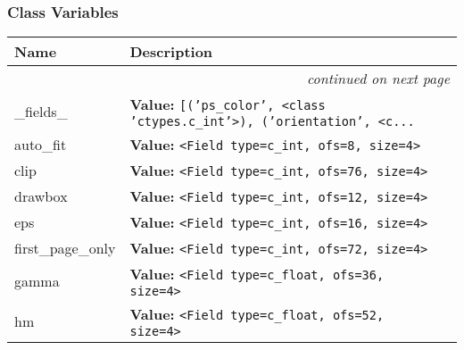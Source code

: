 
  \subsubsection{Class Variables}

    \vspace{-1cm}
\hspace{\varindent}\begin{longtable}{|p{\varnamewidth}|p{\vardescrwidth}|l}
\cline{1-2}
\cline{1-2} \centering \textbf{Name} & \centering \textbf{Description}& \\
\cline{1-2}
\endhead\cline{1-2}\multicolumn{3}{r}{\small\textit{continued on next page}}\\\endfoot\cline{1-2}
\endlastfoot\raggedright \_\-f\-i\-e\-l\-d\-s\-\_\- & \raggedright \textbf{Value:} 
{\tt \texttt{[}\texttt{(}\texttt{'}\texttt{ps\_color}\texttt{'}\texttt{, }{\textless}class 'ctypes.c\_int'{\textgreater}\texttt{)}\texttt{, }\texttt{(}\texttt{'}\texttt{orientation}\texttt{'}\texttt{, }{\textless}c\texttt{...}}&\\
\cline{1-2}
\raggedright a\-u\-t\-o\-\_\-f\-i\-t\- & \raggedright \textbf{Value:} 
{\tt {\textless}Field type=c\_int, ofs=8, size=4{\textgreater}}&\\
\cline{1-2}
\raggedright c\-l\-i\-p\- & \raggedright \textbf{Value:} 
{\tt {\textless}Field type=c\_int, ofs=76, size=4{\textgreater}}&\\
\cline{1-2}
\raggedright d\-r\-a\-w\-b\-o\-x\- & \raggedright \textbf{Value:} 
{\tt {\textless}Field type=c\_int, ofs=12, size=4{\textgreater}}&\\
\cline{1-2}
\raggedright e\-p\-s\- & \raggedright \textbf{Value:} 
{\tt {\textless}Field type=c\_int, ofs=16, size=4{\textgreater}}&\\
\cline{1-2}
\raggedright f\-i\-r\-s\-t\-\_\-p\-a\-g\-e\-\_\-o\-n\-l\-y\- & \raggedright \textbf{Value:} 
{\tt {\textless}Field type=c\_int, ofs=72, size=4{\textgreater}}&\\
\cline{1-2}
\raggedright g\-a\-m\-m\-a\- & \raggedright \textbf{Value:} 
{\tt {\textless}Field type=c\_float, ofs=36, size=4{\textgreater}}&\\
\cline{1-2}
\raggedright h\-m\- & \raggedright \textbf{Value:} 
{\tt {\textless}Field type=c\_float, ofs=52, size=4{\textgreater}}&\\

\end{longtable}
